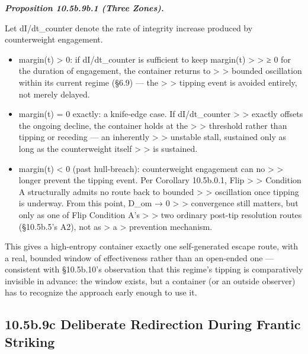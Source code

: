 \documentclass[
]{article}
\begin{document}
\emph{\textbf{Proposition 10.5b.9b.1 (Three Zones).}}

Let dI/dt\_counter denote the rate of integrity increase produced by
counterweight engagement.

\begin{itemize}
\item
  margin(t) \textgreater{} 0: if dI/dt\_counter is sufficient to keep
  margin(t) \textgreater{} \textgreater{} ≥ 0 for the duration of
  engagement, the container returns to \textgreater{} \textgreater{}
  bounded oscillation within its current regime (§6.9) --- the
  \textgreater{} \textgreater{} tipping event is avoided entirely, not
  merely delayed.
\item
  margin(t) = 0 exactly: a knife-edge case. If dI/dt\_counter
  \textgreater{} \textgreater{} exactly offsets the ongoing decline, the
  container holds at the \textgreater{} \textgreater{} threshold rather
  than tipping or receding --- an inherently \textgreater{}
  \textgreater{} unstable stall, sustained only as long as the
  counterweight itself \textgreater{} \textgreater{} is sustained.
\item
  margin(t) \textless{} 0 (past hull-breach): counterweight engagement
  can no \textgreater{} \textgreater{} longer prevent the tipping event.
  Per Corollary 10.5b.0.1, Flip \textgreater{} \textgreater{} Condition
  A structurally admits no route back to bounded \textgreater{}
  \textgreater{} oscillation once tipping is underway. From this point,
  D\_om → 0 \textgreater{} \textgreater{} convergence still matters, but
  only as one of Flip Condition A's \textgreater{} \textgreater{} two
  ordinary post-tip resolution routes (§10.5b.5's A2), not as
  \textgreater{} a \textgreater{} prevention mechanism.
\end{itemize}

This gives a high-entropy container exactly one self-generated escape
route, with a real, bounded window of effectiveness rather than an
open-ended one --- consistent with §10.5b.10's observation that this
regime's tipping is comparatively invisible in advance: the window
exists, but a container (or an outside observer) has to recognize the
approach early enough to use it.

\hypertarget{b.9c-deliberate-redirection-during-frantic-striking}{%
\subsection{10.5b.9c Deliberate Redirection During Frantic
Striking}\label{b.9c-deliberate-redirection-during-frantic-striking}}
\end{document}
